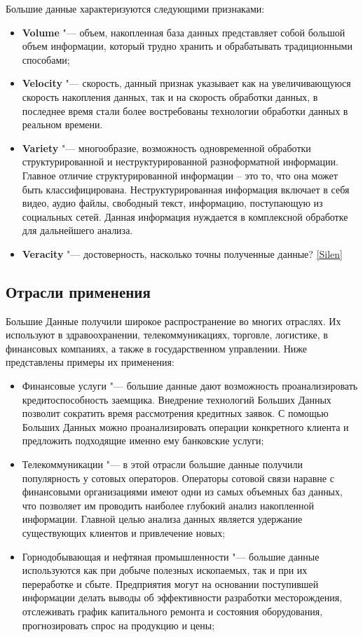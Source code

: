 \documentclass[bachelor, och, pract]{SCWorks}
\begin{document}
Большие данные характеризуются следующими признаками:

\begin{itemize}
	\item \textbf{Volume} "--- объем, накопленная база данных представляет собой большой объем информации, который трудно хранить и обрабатывать традиционными способами;
	\item \textbf{Velocity} "--- скорость, данный признак указывает как на увеличивающуюся скорость накопления данных, так и на скорость обработки данных, в последнее время стали более востребованы технологии обработки данных в реальном времени.
	\item \textbf{Variety} "--- многообразие, возможность одновременной обработки структурированной и неструктурированной разноформатной информации. Главное отличие структурированной информации – это то, что она может быть классифицирована. 
	Неструктурированная информация включает в себя видео, аудио файлы, свободный текст, информацию, поступающую из социальных сетей. Данная информация нуждается в комплексной обработке для дальнейшего анализа. 
	\item \textbf{Veracity} "--- достоверность, насколько точны полученные данные? \ref{Silen}
\end{itemize}

\subsection{Отрасли применения}

Большие Данные получили широкое распространение во многих отраслях. Их используют в здравоохранении, телекоммуникациях, торговле, логистике, в финансовых компаниях, а также в государственном управлении. Ниже представлены примеры их применения:

\begin{itemize}
	\item Финансовые услуги "--- большие данные дают возможность проанализировать кредитоспособность заемщика. Внедрение технологий Больших Данных позволит сократить время рассмотрения кредитных заявок. С помощью Больших Данных можно проанализировать операции конкретного клиента и предложить подходящие именно ему банковские услуги;
	\item Телекоммуникации "--- в этой отрасли большие данные получили популярность у сотовых операторов. Операторы сотовой связи наравне с финансовыми организациями имеют одни из самых объемных баз данных, что позволяет им проводить наиболее глубокий анализ накопленной информации. Главной целью анализа данных является удержание существующих клиентов и привлечение новых;
	\item Горнодобывающая и нефтяная промышленности "--- большие данные используются как при добыче полезных ископаемых, так и при их переработке и сбыте. Предприятия могут на основании поступившей информации делать выводы об эффективности разработки месторождения, отслеживать график капитального ремонта и состояния оборудования, прогнозировать спрос на продукцию и цены;
\end{itemize}
\end{document}
